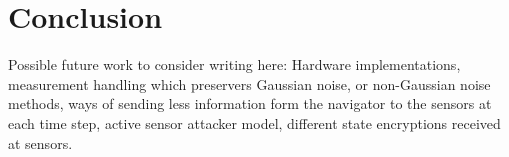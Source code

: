 \documentclass[twocolumn]{autart}    %
\begin{document}
\section{Conclusion}
Possible future work to consider writing here:
Hardware implementations, measurement handling which preservers Gaussian noise, or non-Gaussian noise methods, ways of sending less information form the navigator to the sensors at each time step, active sensor attacker model, different state encryptions received at sensors.








\end{document}
